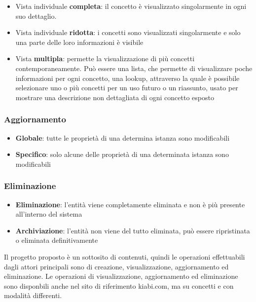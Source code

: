 \documentclass[12pt,italian,]{report}
\providecommand{\tightlist}{%
  \setlength{\itemsep}{0pt}\setlength{\parskip}{0pt}}
\begin{document}
\begin{itemize}
\tightlist
\item
  Vista individuale \textbf{completa}: il concetto è visualizzato
  singolarmente in ogni suo dettaglio.
\item
  Vista individuale \textbf{ridotta}: i concetti sono visualizzati
  singolarmente e solo una parte delle loro informazioni è visibile
\item
  Vista \textbf{multipla}: permette la visualizzazione di più concetti
  contemporaneamente. Può essere una lista, che permette di visualizzare
  poche informazioni per ogni concetto, una lookup, attraverso la quale
  è possibile selezionare uno o più concetti per un uso futuro o un
  riassunto, usato per mostrare una descrizione non dettagliata di ogni
  concetto esposto
\end{itemize}

\hypertarget{aggiornamento}{%
\subsubsection{Aggiornamento}\label{aggiornamento}}

\begin{itemize}
\tightlist
\item
  \textbf{Globale}: tutte le proprietà di una determina istanza sono
  modificabili
\item
  \textbf{Specifico}: solo alcune delle proprietà di una determinata
  istanza sono modificabili
\end{itemize}

\hypertarget{eliminazione}{%
\subsubsection{Eliminazione}\label{eliminazione}}

\begin{itemize}
\tightlist
\item
  \textbf{Eliminazione}: l'entità viene completamente eliminata e non è
  più presente all'interno del sistema
\item
  \textbf{Archiviazione}: l'entità non viene del tutto eliminata, può
  essere ripristinata o eliminata definitivamente
\end{itemize}

Il progetto proposto è un sottosito di contenuti, quindi le operazioni effettuabili dagli attori principali sono di creazione, visualizzazione, aggiornamento ed eliminazione. Le operazioni di visualizzazione, aggiornamento ed eliminazione sono disponbili anche nel sito di riferimento kiabi.com, ma su concetti e con modalità differenti.
\end{document}
